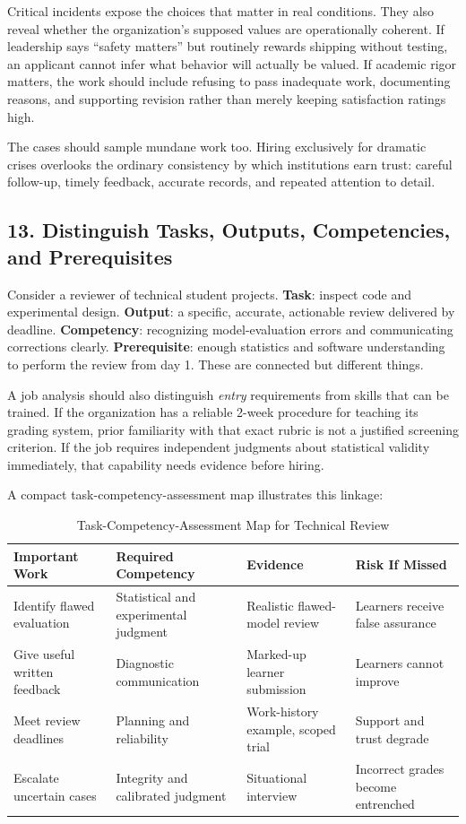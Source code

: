 Critical incidents expose the choices that matter in real conditions. They also reveal whether the organization's supposed values are operationally coherent. If leadership says ``safety matters'' but routinely rewards shipping without testing, an applicant cannot infer what behavior will actually be valued. If academic rigor matters, the work should include refusing to pass inadequate work, documenting reasons, and supporting revision rather than merely keeping satisfaction ratings high.

The cases should sample mundane work too. Hiring exclusively for dramatic crises overlooks the ordinary consistency by which institutions earn trust: careful follow-up, timely feedback, accurate records, and repeated attention to detail.

\subsection*{13. Distinguish Tasks, Outputs, Competencies, and Prerequisites}

Consider a reviewer of technical student projects. \textbf{Task}: inspect code and experimental design. \textbf{Output}: a specific, accurate, actionable review delivered by deadline. \textbf{Competency}: recognizing model-evaluation errors and communicating corrections clearly. \textbf{Prerequisite}: enough statistics and software understanding to perform the review from day 1. These are connected but different things.

A job analysis should also distinguish \textit{entry} requirements from skills that can be trained. If the organization has a reliable 2-week procedure for teaching its grading system, prior familiarity with that exact rubric is not a justified screening criterion. If the job requires independent judgments about statistical validity immediately, that capability needs evidence before hiring.

A compact task-competency-assessment map illustrates this linkage:

\begin{table}[t]
\centering
\small
\caption{Task-Competency-Assessment Map for Technical Review}
\label{tab:task_competency_map}
\begin{tabularx}{\textwidth}{p{3.5cm} p{3.8cm} p{3.8cm} X}
\toprule
\textbf{Important Work} & \textbf{Required Competency} & \textbf{Evidence} & \textbf{Risk If Missed} \\
\midrule
Identify flawed evaluation & Statistical and experimental judgment & Realistic flawed-model review & Learners receive false assurance \\
Give useful written feedback & Diagnostic communication & Marked-up learner submission & Learners cannot improve \\
Meet review deadlines & Planning and reliability & Work-history example, scoped trial & Support and trust degrade \\
Escalate uncertain cases & Integrity and calibrated judgment & Situational interview & Incorrect grades become entrenched \\
\bottomrule
\end{tabularx}
\end{table}

